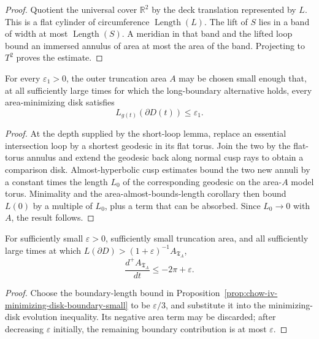 \begin{proof}
\sketch
Quotient the universal cover \(\mathbb R^2\) by the deck translation
represented by \(L\).  This is a flat cylinder of circumference
\(\operatorname{Length}(L)\).  The lift of \(S\) lies in a band of width at most
\(\operatorname{Length}(S)\).  A meridian in that band and the lifted loop
bound an immersed annulus of area at most the area of the band.  Projecting to
\(T^2\) proves the estimate.
\end{proof}

\begin{proposition}
\label{prop:chow-iv-minimizing-disk-boundary-small}
For every \(\varepsilon_1>0\), the outer truncation area \(A\) may be chosen
small enough that, at all sufficiently large times for which the long-boundary
alternative holds, every area-minimizing disk satisfies
\[
 L_{g(t)}(\partial D(t))\le\varepsilon_1.
\]
\end{proposition}

\begin{proof}
\sketch
At the depth supplied by the short-loop lemma, replace an essential
intersection loop by a shortest geodesic in its flat torus.  Join the two by
the flat-torus annulus and extend the geodesic back along normal cusp rays to
obtain a comparison disk.  Almost-hyperbolic cusp estimates bound the two new
annuli by a constant times the length \(L_0\) of the corresponding geodesic on
the area-\(A\) model torus.  Minimality and the area-almost-bounds-length
corollary then bound \(L(0)\) by a multiple of \(L_0\), plus a term that can be
absorbed.  Since \(L_0\to0\) with \(A\), the result follows.
\end{proof}

\begin{lemma}
\label{lem:chow-iv-area-decay-long-boundary}
For sufficiently small \(\varepsilon>0\), sufficiently small truncation area,
and all sufficiently large times at which
\(L(\partial D)>(1+\varepsilon)^{-1}A_{\mathfrak T_A}\),
\[
 \frac{d^+A_{\mathfrak T_A}}{dt}\le-2\pi+\varepsilon.
\]
\end{lemma}

\begin{proof}
\sketch
Choose the boundary-length bound in Proposition~\ref{prop:chow-iv-minimizing-disk-boundary-small}
to be \(\varepsilon/3\), and substitute it into the minimizing-disk evolution
inequality.  Its negative area term may be discarded; after decreasing
\(\varepsilon\) initially, the remaining boundary contribution is at most
\(\varepsilon\).
\end{proof}
